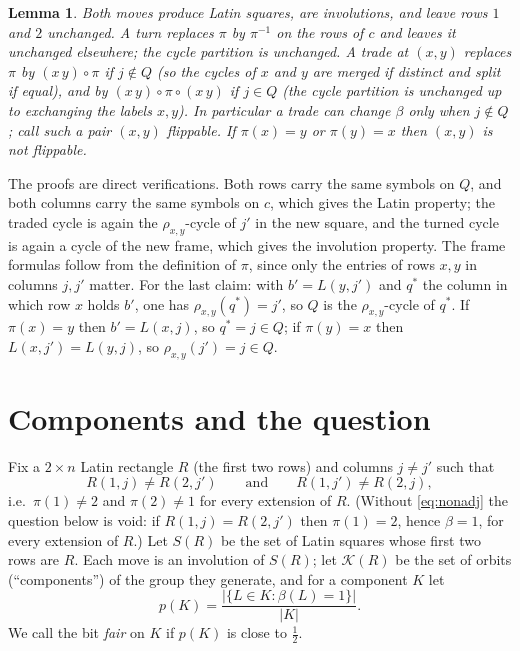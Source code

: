 \documentclass[11pt]{amsart}
\newtheorem{lemma}{Lemma}
\theoremstyle{remark}
\begin{document}
\begin{lemma}
Both moves produce Latin squares, are involutions, and leave rows $1$
and $2$ unchanged.  A turn replaces $\pi$ by $\pi^{-1}$ on the rows of
$c$ and leaves it unchanged elsewhere; the cycle partition is
unchanged.  A trade at $(x,y)$ replaces $\pi$ by
$(x\,y)\circ\pi$ if $j\notin Q$ (so the cycles of $x$ and $y$ are
merged if distinct and split if equal), and by
$(x\,y)\circ\pi\circ(x\,y)$ if $j\in Q$ (the cycle partition is
unchanged up to exchanging the labels $x,y$).  In particular a trade
can change $\beta$ only when $j\notin Q$; call such a pair $(x,y)$
\emph{flippable}.  If $\pi(x)=y$ or $\pi(y)=x$ then $(x,y)$ is not
flippable.
\end{lemma}

The proofs are direct verifications.  Both rows carry the same
symbols on $Q$, and both columns carry the same symbols on $c$, which
gives the Latin property; the traded cycle is again the
$\rho_{x,y}$-cycle of $j'$ in the new square, and the turned cycle is
again a cycle of the new frame, which gives the involution property.
The frame formulas follow from the definition of $\pi$, since only the
entries of rows $x,y$ in columns $j,j'$ matter.  For the last claim:
with $b'=L(y,j')$ and $q^*$ the column in which row $x$ holds $b'$,
one has $\rho_{x,y}(q^*)=j'$, so $Q$ is the $\rho_{x,y}$-cycle of
$q^*$.  If $\pi(x)=y$ then $b'=L(x,j)$, so $q^*=j\in Q$; if
$\pi(y)=x$ then $L(x,j')=L(y,j)$, so $\rho_{x,y}(j')=j\in Q$.

\section*{Components and the question}

Fix a $2\times n$ Latin rectangle $R$ (the first two rows) and
columns $j\ne j'$ such that
\begin{equation}\label{eq:nonadj}
R(1,j)\ne R(2,j')\qquad\text{and}\qquad R(1,j')\ne R(2,j),
\end{equation}
i.e.\ $\pi(1)\ne2$ and $\pi(2)\ne1$ for every extension of $R$.
(Without \eqref{eq:nonadj} the question below is void: if
$R(1,j)=R(2,j')$ then $\pi(1)=2$, hence $\beta=1$, for every extension
of $R$.)  Let $S(R)$ be the set of Latin squares whose first two rows
are $R$.  Each move is an involution of $S(R)$; let $\mathcal K(R)$
be the set of orbits (``components'') of the group they generate, and
for a component $K$ let
\[
p(K)=\frac{|\{L\in K:\beta(L)=1\}|}{|K|}.
\]
We call the bit \emph{fair} on $K$ if $p(K)$ is close to $\tfrac12$.
\end{document}
